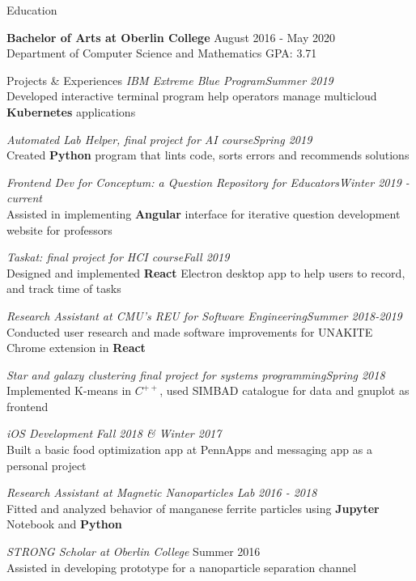 \documentclass{resume} %
\begin{document}

\begin{rSection}{Education}

{\bf Bachelor of Arts at Oberlin College} \hfill { August 2016 - May 2020} 
\\ Department of Computer Science and Mathematics \hfill { GPA: 3.71} 


\end{rSection}
\begin{rSection}{Projects \& Experiences}
{\it IBM Extreme Blue Program}\hfill  {\em Summer 2019} \\
Developed interactive terminal program help operators manage  multicloud \textbf{Kubernetes} applications 

{\it Automated Lab Helper, final project for AI course}\hfill  {\em Spring 2019} \\
Created \textbf{Python} program that lints code, sorts errors and recommends solutions

{\it Frontend Dev for Conceptum: a Question Repository for Educators}\hfill  {\em Winter 2019 - current} \\
Assisted in implementing \textbf{Angular} interface for iterative question development website for professors

{\it Taskat: final project for HCI course}\hfill  {\em Fall 2019} \\
Designed and implemented \textbf{React} Electron desktop app to help users to record, and track time of tasks

{\it Research Assistant at CMU's REU for Software Engineering}\hfill {\em Summer 2018-2019} \\
Conducted user research and made software improvements for UNAKITE Chrome extension in \textbf{React}

{\it Star and galaxy clustering final project for systems programming}\hfill {\em Spring 2018} \\
Implemented K-means in \textbf{$C^{++}$}, used SIMBAD catalogue for data and gnuplot as frontend

{\it iOS Development} {\em Fall 2018 \& Winter 2017}\\
{Built a basic food optimization app at PennApps and messaging app as a personal project}\hfill


{\it Research Assistant at Magnetic Nanoparticles Lab} \hfill {\em 2016 - 2018}\\
Fitted and analyzed behavior of manganese ferrite particles using \textbf{Jupyter} Notebook and \textbf{Python}

{\it STRONG Scholar at Oberlin College} \hfill {Summer 2016}\\
Assisted in developing prototype for a nanoparticle separation channel


\end{rSection}
\end{document}
